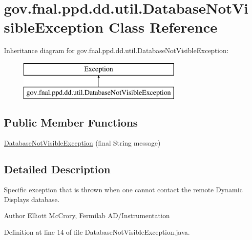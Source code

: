 \hypertarget{classgov_1_1fnal_1_1ppd_1_1dd_1_1util_1_1DatabaseNotVisibleException}{\section{gov.\-fnal.\-ppd.\-dd.\-util.\-Database\-Not\-Visible\-Exception Class Reference}
\label{classgov_1_1fnal_1_1ppd_1_1dd_1_1util_1_1DatabaseNotVisibleException}
}
Inheritance diagram for gov.\-fnal.\-ppd.\-dd.\-util.\-Database\-Not\-Visible\-Exception\-:\begin{figure}[H]
\begin{center}
\leavevmode
\includegraphics[height=2.000000cm]{classgov_1_1fnal_1_1ppd_1_1dd_1_1util_1_1DatabaseNotVisibleException}
\end{center}
\end{figure}
\subsection*{Public Member Functions}
\begin{DoxyCompactItemize}
\item 
\hyperlink{classgov_1_1fnal_1_1ppd_1_1dd_1_1util_1_1DatabaseNotVisibleException_a87d0b13a309fa5e1441794e704846e09}{Database\-Not\-Visible\-Exception} (final String message)
\end{DoxyCompactItemize}


\subsection{Detailed Description}
Specific exception that is thrown when one cannot contact the remote Dynamic Displays database.

\begin{DoxyAuthor}{Author}
Elliott Mc\-Crory, Fermilab A\-D/\-Instrumentation 
\end{DoxyAuthor}


Definition at line 14 of file Database\-Not\-Visible\-Exception.\-java.



